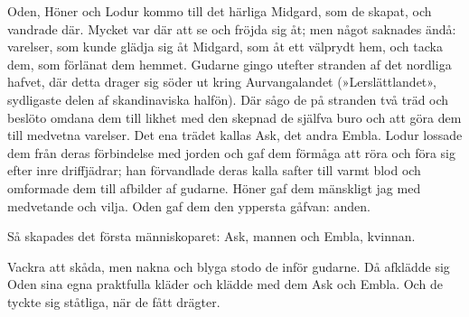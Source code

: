 Oden, Höner och Lodur kommo till det härliga Midgard, som de skapat, och
vandrade där. Mycket var där att se och fröjda sig åt; men något
saknades ändå: varelser, som kunde glädja sig åt Midgard, som åt ett
välprydt hem, och tacka dem, som förlänat dem hemmet. Gudarne gingo
utefter stranden af det nordliga hafvet, där detta drager sig söder ut
kring Aurvangalandet (»Lerslättlandet», sydligaste delen af
skandinaviska halfön). Där sågo de på stranden två träd och beslöto
omdana dem till likhet med den skepnad de själfva buro och att göra dem
till medvetna varelser. Det ena trädet kallas Ask, det andra Embla.
Lodur lossade dem från deras förbindelse med jorden och gaf dem förmåga
att röra och föra sig efter inre driffjädrar; han förvandlade deras
kalla safter till varmt blod och omformade dem till afbilder af gudarne.
Höner gaf dem mänskligt jag med medvetande och vilja. Oden gaf dem den
yppersta gåfvan: anden.

\protect\hypertarget{lb1625905.xhtmlux5cux23start19}{}{}\protect\hypertarget{lb1625905.xhtmlux5cux23start19-a}{}{}\protect\hypertarget{lb1625905.xhtmlux5cux23start19-b}{}{}\protect\hypertarget{lb1625905.xhtmlux5cux23start19-c}{}{}\protect\hypertarget{lb1625905.xhtmlux5cux23start19-d}{}{}

Så skapades det första människoparet: Ask, mannen och Embla, kvinnan.

Vackra att skåda, men nakna och blyga stodo de inför gudarne. Då
afklädde sig Oden sina egna praktfulla kläder och klädde med dem Ask och
Embla. Och de tyckte sig ståtliga, när de fått drägter.

